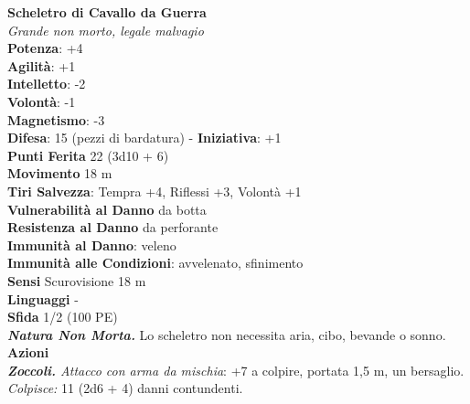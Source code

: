 \begin{multicols}{2}
\medskip\textbf{Scheletro di Cavallo da Guerra}\\
\emph{Grande non morto, legale malvagio}\\
\textbf{Potenza}: +4\\
\textbf{Agilità}: +1\\
\textbf{Intelletto}: -2\\
\textbf{Volontà}: -1\\
\textbf{Magnetismo}: -3\\
\textbf{Difesa}: 15 (pezzi di bardatura) - \textbf{Iniziativa}: +1\\
\textbf{Punti Ferita} 22 (3d10 + 6)\\
\textbf{Movimento} 18 m\\
\textbf{Tiri Salvezza}: Tempra +4, Riflessi +3, Volontà +1\\
\textbf{Vulnerabilità al Danno} da botta\\
\textbf{Resistenza al Danno} da perforante\\
\textbf{Immunità al Danno}: veleno\\
\textbf{Immunità alle Condizioni}: avvelenato, sfinimento\\
\textbf{Sensi} Scurovisione 18 m\\
\textbf{Linguaggi} -\\
\textbf{Sfida} 1/2 (100 PE)\smallskip\\
\emph{\textbf{Natura Non Morta.}} Lo scheletro non necessita aria, cibo, bevande o sonno.\\
\smallskip\textbf{Azioni}\\
\emph{\textbf{Zoccoli.} Attacco con arma da mischia}: +7 a colpire, portata 1,5 m, un bersaglio.\\
\emph{Colpisce:} 11 (2d6 + 4) danni contundenti.\\


\end{multicols}
